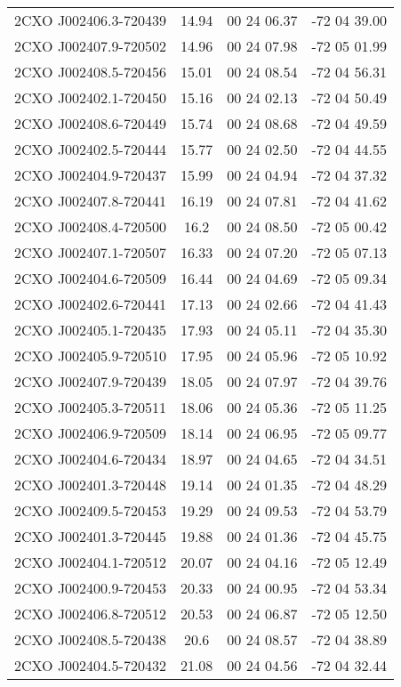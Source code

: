 \begin{table}
\begin{tabular}{cccc}
2CXO J002406.3-720439 & 14.94 & 00 24 06.37 & -72 04 39.00 \\
2CXO J002407.9-720502 & 14.96 & 00 24 07.98 & -72 05 01.99 \\
2CXO J002408.5-720456 & 15.01 & 00 24 08.54 & -72 04 56.31 \\
2CXO J002402.1-720450 & 15.16 & 00 24 02.13 & -72 04 50.49 \\
2CXO J002408.6-720449 & 15.74 & 00 24 08.68 & -72 04 49.59 \\
2CXO J002402.5-720444 & 15.77 & 00 24 02.50 & -72 04 44.55 \\
2CXO J002404.9-720437 & 15.99 & 00 24 04.94 & -72 04 37.32 \\
2CXO J002407.8-720441 & 16.19 & 00 24 07.81 & -72 04 41.62 \\
2CXO J002408.4-720500 & 16.2 & 00 24 08.50 & -72 05 00.42 \\
2CXO J002407.1-720507 & 16.33 & 00 24 07.20 & -72 05 07.13 \\
2CXO J002404.6-720509 & 16.44 & 00 24 04.69 & -72 05 09.34 \\
2CXO J002402.6-720441 & 17.13 & 00 24 02.66 & -72 04 41.43 \\
2CXO J002405.1-720435 & 17.93 & 00 24 05.11 & -72 04 35.30 \\
2CXO J002405.9-720510 & 17.95 & 00 24 05.96 & -72 05 10.92 \\
2CXO J002407.9-720439 & 18.05 & 00 24 07.97 & -72 04 39.76 \\
2CXO J002405.3-720511 & 18.06 & 00 24 05.36 & -72 05 11.25 \\
2CXO J002406.9-720509 & 18.14 & 00 24 06.95 & -72 05 09.77 \\
2CXO J002404.6-720434 & 18.97 & 00 24 04.65 & -72 04 34.51 \\
2CXO J002401.3-720448 & 19.14 & 00 24 01.35 & -72 04 48.29 \\
2CXO J002409.5-720453 & 19.29 & 00 24 09.53 & -72 04 53.79 \\
2CXO J002401.3-720445 & 19.88 & 00 24 01.36 & -72 04 45.75 \\
2CXO J002404.1-720512 & 20.07 & 00 24 04.16 & -72 05 12.49 \\
2CXO J002400.9-720453 & 20.33 & 00 24 00.95 & -72 04 53.34 \\
2CXO J002406.8-720512 & 20.53 & 00 24 06.87 & -72 05 12.50 \\
2CXO J002408.5-720438 & 20.6 & 00 24 08.57 & -72 04 38.89 \\
2CXO J002404.5-720432 & 21.08 & 00 24 04.56 & -72 04 32.44 \\

\end{tabular}
\end{table}
